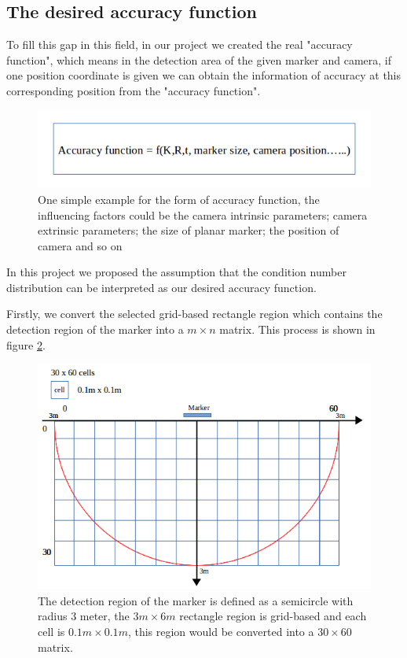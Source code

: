 \subsection{The desired accuracy function}
To fill this gap in this field, in our project we created the real "accuracy function", which means in the detection area of the given marker and camera, if one position coordinate is given we can obtain the information of accuracy at this corresponding position from the "accuracy function".

\begin{figure}[H]
\centering
\includegraphics[scale=0.8]{./fig/acc_simple.png}
\caption{One simple example for the form of accuracy function, the influencing factors could be the camera intrinsic parameters; camera extrinsic parameters; the size of planar marker; the position of camera and so on}
\label{fig:acc_simple}
\end{figure}
In this project we proposed the assumption that the condition number distribution can be interpreted as our desired accuracy function. 

Firstly, we convert the selected grid-based rectangle region which contains the detection region of the marker into a $m \times n$ matrix. This process is shown in figure \ref{fig:mncells}.

\begin{figure}[H]
\centering
\includegraphics[scale=0.8]{./fig/mncells.png}
\caption{The detection region of the marker is defined as a semicircle with radius 3 meter, the $3m \times 6m$ rectangle region is grid-based and each cell is $0.1m \times 0.1m$, this region would be converted into a $30 \times 60$ matrix.}  
\label{fig:mncells}
\end{figure}

